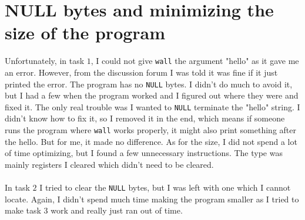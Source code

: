 \documentclass[a4paper]{article}
\begin{document}
\section{NULL bytes and minimizing the size of the program}
Unfortunately, in task $1$, I could not give \texttt{wall} the argument "hello" as it gave me an error. However, from the discussion forum I was told it was fine if it just printed the error. The program has no \texttt{NULL} bytes. I didn't do much to avoid it, but I had a few when the program worked and I figured out where they were and fixed it. The only real trouble was I wanted to \texttt{NULL} terminate the "hello" string. I didn't know how to fix it, so I removed it in the end, which means if someone runs the program where \texttt{wall} works properly, it might also print something after the hello. But for me, it made no difference. As for the size, I did not spend a lot of time optimizing, but I found a few unnecessary instructions. The type was mainly registers I cleared which didn't need to be cleared. \\
\\
In task $2$ I tried to clear the \texttt{NULL} bytes, but I was left with one which I cannot locate. Again, I didn't spend much time making the program smaller as I tried to make task $3$ work and really just ran out of time.
\end{document}
